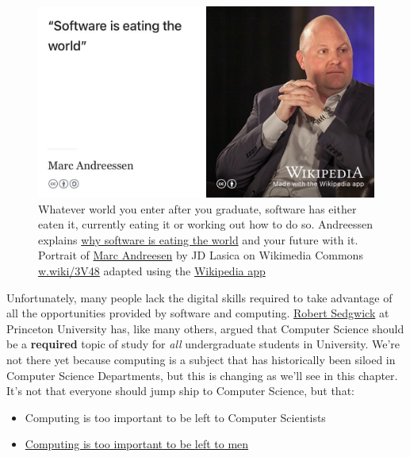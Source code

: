 \documentclass[
]{book}
\providecommand{\tightlist}{%
  \setlength{\itemsep}{0pt}\setlength{\parskip}{0pt}}
\begin{document}
\begin{figure}

{\centering \includegraphics[width=1\linewidth]{images/software-is-eating-the-world} 

}

\caption{Whatever world you enter after you graduate, software has either eaten it, currently eating it or working out how to do so. Andreessen explains \href{https://a16z.com/2011/08/20/why-software-is-eating-the-world/}{why software is eating the world} and your future with it. Portrait of \href{https://en.wikipedia.org/wiki/Marc_Andreessen}{Marc Andreesen} by JD Lasica on Wikimedia Commons \href{https://w.wiki/3V48}{w.wiki/3V48} adapted using the \href{https://apps.apple.com/gb/app/wikipedia/id324715238}{Wikipedia app}}\label{fig:eating-fig}
\end{figure}



Unfortunately, many people lack the digital skills required to take advantage of all the opportunities provided by software and computing. \href{https://en.wikipedia.org/wiki/Robert_Sedgewick_(computer_scientist)}{Robert Sedgwick} at Princeton University has, like many others, argued that Computer Science should be a \textbf{required} topic of study for \emph{all} undergraduate students in University. \citep{robertsedgwick} We're not there yet because computing is a subject that has historically been siloed in Computer Science Departments, but this is changing as we'll see in this chapter. It's not that everyone should jump ship to Computer Science, but that:

\begin{itemize}
\tightlist
\item
  Computing is too important to be left to Computer Scientists
\item
  \href{https://www.bcs.org/content-hub/computings-too-important-to-be-left-to-men/}{Computing is too important to be left to men} \citep{sparckjones}
\end{itemize}
\end{document}
